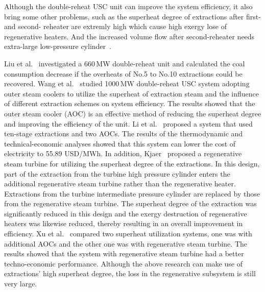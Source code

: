 \documentclass[preprint,12pt]{elsarticle}
\begin{document}
Although the double-reheat USC unit can improve the system efficiency, it also bring some other problems, such as the superheat degree of extractions after first- and second- reheater are extremly high which cause high exergy lose of regenerative heaters. 
And the increased volume flow after second-reheater needs extra-large low-pressure cylinder~\cite{nicol2015application}.

Liu et al.~\cite{Liu2017} investigated a 660\,MW double-reheat unit and calculated the coal consumption decrease if the overheats of No.5 to No.10 extractions could be recovered.
Wang et al.~\cite{Wang2016} studied 1000\,MW double-reheat USC system adopting outer steam coolers to utilize the superheat of extraction steam and the influence of different extraction schemes on system efficiency.
The results showed that the  outer steam cooler (AOC) is an effective method of reducing the superheat degree and improving the efficiency of the unit.
Li et al.~\cite{Li2014Thermodynamic} proposed a system that used ten-stage extractions and two AOCs. 
The results of the thermodynamic and technical-economic analyses showed that this system can lower the cost of electricity to 55.89 USD/MWh.
In addition, Kjaer~\cite{Kjaer2010A} proposed a regenerative steam turbine for utilizing the superheat degree of the extractions.
In this design, part of the extraction from the turbine high pressure cylinder enters the additional regenerative steam turbine rather than the regenerative heater.
Extractions from the turbine intermediate pressure cylinder are replaced by those from the regenerative steam turbine.
The superheat degree of the extraction was significantly reduced in this design and the exergy destruction of regenerative heaters was likewise reduced, thereby resulting in an overall improvement in efficiency.
Xu et al.~\cite{Xu2015Optimum} compared two superheat utilization systems, one was with additional AOCs and the other one was with regenerative steam turbine.
The results showed that the system with regenerative steam turbine had a better techno-economic performance.
Although the above research can make use of extractions' high superheat degree, the loss in the regenerative subsystem is still very large. 
\end{document}
